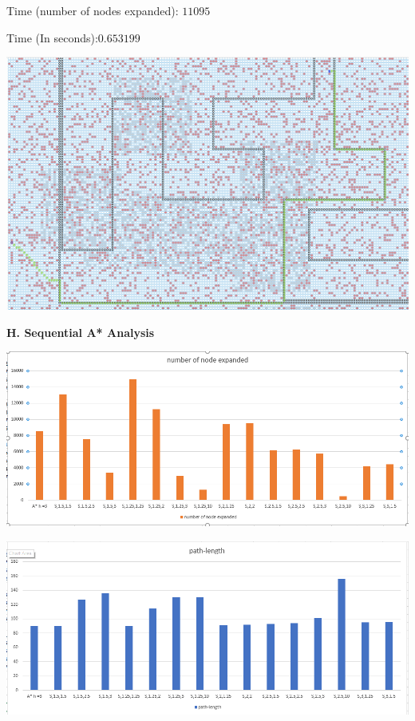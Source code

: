 \documentclass[12pt, letterpaper]{article}
\begin{document}
Time (number of nodes expanded): $ 11095 $

Time (In seconds):$ 0.653199 $

\noindent \includegraphics[scale=0.2]{"g-sns-map3-1"}

\medskip
\pagebreak %

\noindent \textbf{H. Sequential A* Analysis}

\noindent \includegraphics[scale=0.6]{"s-nodeexpanded"}

\medskip

\noindent \includegraphics[scale=0.6]{"s-pathlength"}
\end{document}
